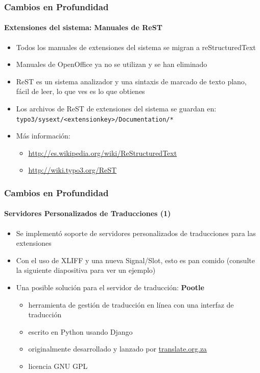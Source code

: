 \begin{frame}[fragile]
	\frametitle{Cambios en Profundidad}
	\framesubtitle{Extensiones del sistema: Manuales de ReST}

	\begin{itemize}
		\item Todos los manuales de extensiones del sistema se migran a reStructuredText
		\item Manuales de OpenOffice ya no se utilizan y se han eliminado
		\item ReST es un sistema analizador y una sintaxis de marcado de texto plano, fácil de leer, lo que ves es lo que obtienes
		\item Los archivos de ReST de extensiones del sistema se guardan en:\newline
			\texttt{typo3/sysext/<extensionkey>/Documentation/*}

		\item Más información:

			\begin{itemize}
				\item \url{http://es.wikipedia.org/wiki/ReStructuredText}
				\item \url{http://wiki.typo3.org/ReST}
			\end{itemize}

	\end{itemize}

\end{frame}


\begin{frame}[fragile]
	\frametitle{Cambios en Profundidad}
	\framesubtitle{Servidores Personalizados de Traducciones (1)}

	\begin{itemize}
		\item Se implementó soporte de servidores personalizados de traducciones para las extensiones
		\item Con el uso de XLIFF y una nueva Signal/Slot,\newline
			esto es pan comido (consulte la siguiente diapositiva para ver un ejemplo)
		\item Una posible solución para el servidor de traducción: \textbf{Pootle}

			\begin{itemize}
				\item herramienta de gestión de traducción en línea con una interfaz de traducción
				\item escrito en Python usando Django
				\item originalmente desarrollado y lanzado por \url{translate.org.za}
				\item licencia GNU GPL
			\end{itemize}

	\end{itemize}

\end{frame}

